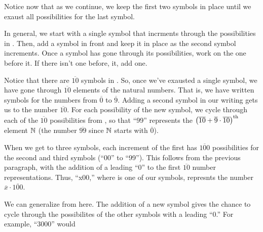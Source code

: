 \documentclass{article}
\begin{document}
	Notice now that as we continue, we keep the first two symbols in place until we exaust all possibilities for the last symbol.
	
	In general, we start with a single symbol that incrments through the possibilities in . Then, add a symbol in front and keep it in place as the second symbol increments. Once a symbol has gone through its possibilities, work on the one before it. If there isn't one before, it, add one.
	
	Notice that there are $\overline{10}$ symbols in . So, once we've exausted a single symbol, we have gone through $\overline{10}$ elements of the natural numbers. That is, we have written symbols for the numbers from $\overline{0}$ to $\overline{9}$. Adding a second symbol in our writing gets us to the number $\overline{10}$. For each possibility of the new symbol, we cycle through each of the $\overline{10}$ possibilities from , so that ``99'' represents the $\pqty{\overline{10}+\overline{9}\cdot\overline{10}}^\text{th}$ element $\mathbb{N}$ (the number $\overline{99}$ since $\mathbb{N}$ starts with $\overline{0}$).
	
	When we get to three symbols, each increment of the first has $\overline{100}$ possibilities for the second and third symbols (``00'' to ``99''). This follows from the previous paragraph, with the addition of a leading ``0'' to the first $\overline{10}$ number representations. Thus, ``x00,'' where is one of our symbols, represnts the number $\overline{x}\cdot\overline{100}$.
	
	
	We can generalize from here. The addition of a new symbol gives the chance to cycle through the possibilites of the other symbols with a leading ``0.'' For example, ``3000'' would 
\end{document}
